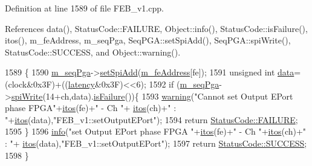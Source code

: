 Definition at line 1589 of file F\+E\+B\+\_\+v1.\+cpp.



References data(), Status\+Code\+::\+F\+A\+I\+L\+U\+RE, Object\+::info(), Status\+Code\+::is\+Failure(), itos(), m\+\_\+fe\+Address, m\+\_\+seq\+Pga, Seq\+P\+G\+A\+::set\+Spi\+Add(), Seq\+P\+G\+A\+::spi\+Write(), Status\+Code\+::\+S\+U\+C\+C\+E\+SS, and Object\+::warning().


\begin{DoxyCode}
1589                                                                        \{
1590   \hyperlink{classFEB__v1_a6c7804ac86796f233a8393043adf2e77}{m\_seqPga}->\hyperlink{classSeqPGA_ac998ce3a6d9b5f2e88cc8393f8c1df53}{setSpiAdd}(\hyperlink{classFEB__v1_a4e1945c2d5b434125f375e9d0fc6d99f}{m\_feAddress}[fe]);
1591   \textcolor{keywordtype}{unsigned} \textcolor{keywordtype}{int} \hyperlink{classFEB__v1_a6bca4320bd3bbbc32efc81097f33421a}{data}=(clock&0x3F)+((\hyperlink{classFEB__v1_a68050d232efd8d6568910b09a2c18f62}{latency}&0x3F)<<6);
1592   \textcolor{keywordflow}{if} (\hyperlink{classFEB__v1_a6c7804ac86796f233a8393043adf2e77}{m\_seqPga}->\hyperlink{classSeqPGA_ad4421841ce4ce8b88ad13f63216f0743}{spiWrite}(14+ch,data).\hyperlink{classStatusCode_a5dd22dc6eb2c52fc4cabc58f6dea2eb7}{isFailure}())\{
1593     \hyperlink{classObject_a65cd4fda577711660821fd2cd5a3b4c9}{warning}(\textcolor{stringliteral}{"Cannot set Output EPort phase FPGA"}+\hyperlink{Tools_8h_af330027dbdafb9a30768b3613c553e60}{itos}(fe)+\textcolor{stringliteral}{" - Ch "}+
      \hyperlink{Tools_8h_af330027dbdafb9a30768b3613c553e60}{itos}(ch)+\textcolor{stringliteral}{" : "}+\hyperlink{Tools_8h_af330027dbdafb9a30768b3613c553e60}{itos}(data),\textcolor{stringliteral}{"FEB\_v1::setOutputEPort"});
1594     \textcolor{keywordflow}{return} \hyperlink{classStatusCode_a6f565cbeadc76d14c72f047e5e85eb4ba3da73d4c469762eb9d3c960368252b26}{StatusCode::FAILURE};
1595   \}
1596   \hyperlink{classObject_a644fd329ea4cb85f54fa6846484b84a8}{info}(\textcolor{stringliteral}{"set Output EPort phase FPGA "}+\hyperlink{Tools_8h_af330027dbdafb9a30768b3613c553e60}{itos}(fe)+\textcolor{stringliteral}{" - Ch "}+\hyperlink{Tools_8h_af330027dbdafb9a30768b3613c553e60}{itos}(ch)+\textcolor{stringliteral}{" : "}+
      \hyperlink{Tools_8h_af330027dbdafb9a30768b3613c553e60}{itos}(data),\textcolor{stringliteral}{"FEB\_v1::setOutputEPort"});
1597   \textcolor{keywordflow}{return} \hyperlink{classStatusCode_a6f565cbeadc76d14c72f047e5e85eb4badd0da38d3ba0d922efd1f4619bc37ad8}{StatusCode::SUCCESS};
1598 \}
\end{DoxyCode}
\mbox{\label{classFEB__v1_abb013a3441c02f57cea07a244554fdd5}} 
